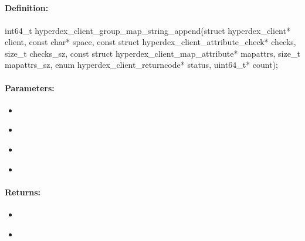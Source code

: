 \pagebreak
\subsection{}
\label{api:c:group_map_string_append}


\paragraph{Definition:}
\begin{ccode}
int64_t hyperdex_client_group_map_string_append(struct hyperdex_client* client,
        const char* space,
        const struct hyperdex_client_attribute_check* checks, size_t checks_sz,
        const struct hyperdex_client_map_attribute* mapattrs, size_t mapattrs_sz,
        enum hyperdex_client_returncode* status,
        uint64_t* count);
\end{ccode}

\paragraph{Parameters:}
\begin{itemize}[noitemsep]
\item {}\\

\item {}\\

\item {}\\

\item {}\\

\end{itemize}

\paragraph{Returns:}
\begin{itemize}[noitemsep]
\item {}\\

\item {}\\

\end{itemize}


